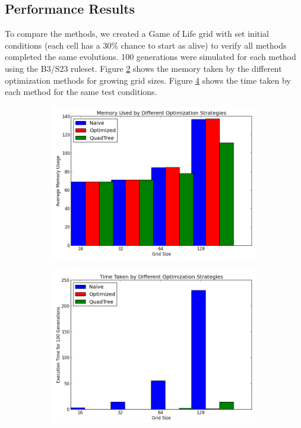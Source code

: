 \documentclass[11pt]{article}
\begin{document}
\subsection{Performance Results}
To compare the methods, we created a Game of Life grid with set initial conditions (each cell has a 30\% chance to start as alive) to verify all methods completed the same evolutions.  100 generations were simulated for each method using the B3/S23 ruleset.  Figure \ref{fig:avg_mem_use} shows the memory taken by the different optimization methods for growing grid sizes.  Figure \ref{fig:avg_time_use} shows the time taken by each method for the same test conditions.
\begin{figure}[!ht]
	\centering
	\begin{subfigure}{\textwidth}
		\centering
  	  	\includegraphics[width=0.75\linewidth]{images/average_random.png}
  	  	\label{fig:avg_mem}
	\end{subfigure}
	\caption{}
	\label{fig:avg_mem_use}
\end{figure}
\begin{figure}[!ht]
	\centering
	\begin{subfigure}{\textwidth}
		\centering
  	  	\includegraphics[width=0.75\linewidth]{images/time_random.png}
  	  	\label{fig:avg_time}
	\end{subfigure}
	\caption{}
	\label{fig:avg_time_use}
\end{figure}
\end{document}
